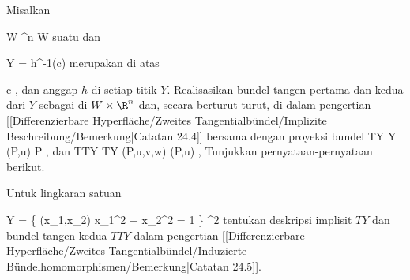 {}
{

Misalkan

\mavergleichskette
{\vergleichskette
{ W
}
{ \subseteq }{ \R^n
}
{  }{
}
{    }{
}
{   }{
}
}
{}{}{}
 { W } { \R
} {}
suatu
dan

\mavergleichskette
{\vergleichskette
{ Y
}
{ = }{ h^{-1}(c)
}
{  }{
}
{    }{
}
{   }{
}
}
{}{}{}
merupakan
di atas

\mavergleichskette
{\vergleichskette
{ c
}
{ \in }{ \R
}
{  }{
}
{    }{
}
{   }{
}
}
{}{}{,}
dan anggap $h$
di setiap titik $Y$. Realisasikan bundel tangen pertama dan kedua
dari $Y$ sebagai
di $W \times \R^n$ dan, secara berturut-turut, di
 dalam pengertian
[[Differenzierbare Hyperfläche/Zweites Tangentialbündel/Implizite Beschreibung/Bemerkung|Catatan 24.4]]
bersama dengan proyeksi bundel
\maabbeledisp {\pi} {TY} {Y
} {(P,u)} {P
} {,}
dan
 {TTY} {TY
} {(P,u,v,w)} {(P,u)
} {,}
Tunjukkan pernyataan-pernyataan berikut.

}
{} {}

{}
{

Untuk lingkaran satuan

\mavergleichskettedisp
{\vergleichskette
{ Y
}
{ =} { \left\{ (x_1,x_2)  \mid   x_1^2 + x_2^2 = 1         \right\}
}
{ \subset} { \R^2
}
{ } {
}
{ } {
}
}
{}{}{}
tentukan deskripsi implisit
$TY$ dan bundel tangen kedua $TTY$ dalam pengertian
[[Differenzierbare Hyperfläche/Zweites Tangentialbündel/Induzierte Bündelhomomorphismen/Bemerkung|Catatan 24.5]].

}
{} {}

